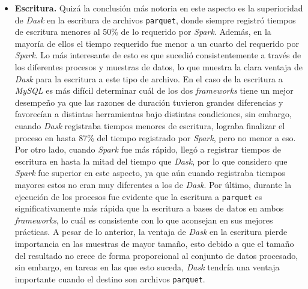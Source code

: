 \begin{itemize}
	\item \textbf{Escritura.} Quizá la conclusión más notoria en este aspecto es la superioridad de \textit{Dask} en la escritura de archivos \texttt{parquet}, donde siempre registró tiempos de escritura menores al 50\% de lo requerido por \textit{Spark}. Además, en la mayoría de ellos el tiempo requerido fue menor a un cuarto del requerido por \textit{Spark}. Lo más interesante de esto es que sucedió consistentemente a través de los diferentes procesos y muestras de datos, lo que muestra la clara ventaja de \textit{Dask} para la escritura a este tipo de archivo. En el caso de la escritura a \textit{MySQL} es más difícil determinar cuál de los dos \textit{frameworks} tiene un mejor desempeño ya que las razones de duración tuvieron grandes diferencias y favorecían a distintas herramientas bajo distintas condiciones, sin embargo, cuando \textit{Dask} registraba tiempos menores de escritura, lograba finalizar el proceso en hasta 87\% del tiempo registrado por \textit{Spark}, pero no menor a eso. Por otro lado, cuando \textit{Spark} fue más rápido, llegó a registrar tiempos de escritura en hasta la mitad del tiempo que \textit{Dask}, por lo que considero que \textit{Spark} fue superior en este aspecto, ya que aún cuando registraba tiempos mayores estos no eran muy diferentes a los de \textit{Dask}. Por último, durante la ejecución de los procesos fue evidente que la escritura a \texttt{parquet} es significativamente más rápida que la escritura a bases de datos en ambos \textit{frameworks}, lo cuál es consistente con lo que aconsejan en sus mejores prácticas. A pesar de lo anterior, la ventaja de \textit{Dask} en la escritura pierde importancia en las muestras de mayor tamaño, esto debido a que el tamaño del resultado no crece de forma proporcional al conjunto de datos procesado, sin embargo, en tareas en las que esto suceda, \textit{Dask} tendría una ventaja importante cuando el destino son archivos \texttt{parquet}.
		

\end{itemize}
